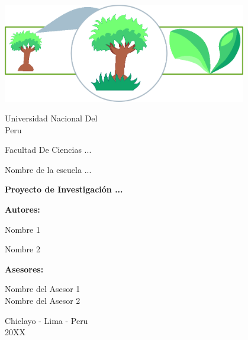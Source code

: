 \begin{titlepage}
\vspace*{1.5cm}
\begin{center}
 \includegraphics[width=0.8\textwidth]{logo.png}
 \end{center}
 {\Huge
    \begin{center}
    Universidad Nacional Del \\
    Peru \vspace{0.3cm}\par
    
    Facultad De Ciencias ...
    \end{center}
 }
 \vspace{0.5cm}
 \begin{center}
 \Large
    Nombre de la escuela ...
 \end{center}
 \vspace{1.4cm}\par
 
 \begin{center}
 \bf \Huge
 Proyecto de Investigación ...
 \end{center}\vfill
 
 \begin{center}
    \textbf{\Large Autores:}\par
    Nombre 1 \par
    Nombre 2 
    \vspace{0.6cm}\par
    \textbf{\Large Asesores:}\par
    {
        \Large
        Nombre del Asesor 1  \\
        Nombre del Asesor 2 
    }\vspace{0.5cm}\par
    
    Chiclayo - Lima - Peru \\
        20XX
  \end{center}
  
\end{titlepage}